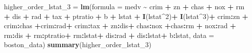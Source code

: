 \documentclass[
]{article}
\newenvironment{Shaded}{\begin{snugshade}}{\end{snugshade}}
\newcommand{\AttributeTok}[1]{\textcolor[rgb]{0.13,0.29,0.53}{#1}}
\newcommand{\DecValTok}[1]{\textcolor[rgb]{0.00,0.00,0.81}{#1}}
\newcommand{\FunctionTok}[1]{\textcolor[rgb]{0.13,0.29,0.53}{\textbf{#1}}}
\newcommand{\NormalTok}[1]{#1}
\newcommand{\OtherTok}[1]{\textcolor[rgb]{0.56,0.35,0.01}{#1}}
\newcommand{\SpecialCharTok}[1]{\textcolor[rgb]{0.81,0.36,0.00}{\textbf{#1}}}
\begin{document}
\begin{Shaded}
\begin{Highlighting}[]
\NormalTok{higher\_order\_lstat\_3 }\OtherTok{=} \FunctionTok{lm}\NormalTok{(}\AttributeTok{formula =}\NormalTok{ medv }\SpecialCharTok{\textasciitilde{}}\NormalTok{ crim }\SpecialCharTok{+}\NormalTok{ zn }\SpecialCharTok{+}\NormalTok{ chas }\SpecialCharTok{+}\NormalTok{ nox }\SpecialCharTok{+}\NormalTok{ rm }\SpecialCharTok{+}\NormalTok{ dis }\SpecialCharTok{+}\NormalTok{ rad }\SpecialCharTok{+}\NormalTok{ tax }\SpecialCharTok{+}\NormalTok{ ptratio }\SpecialCharTok{+}\NormalTok{ b }\SpecialCharTok{+}\NormalTok{ lstat }\SpecialCharTok{+} \FunctionTok{I}\NormalTok{(lstat}\SpecialCharTok{\^{}}\DecValTok{2}\NormalTok{)}\SpecialCharTok{+} \FunctionTok{I}\NormalTok{(lstat}\SpecialCharTok{\^{}}\DecValTok{3}\NormalTok{)}\SpecialCharTok{+}\NormalTok{ crim}\SpecialCharTok{:}\NormalTok{zn }\SpecialCharTok{+}\NormalTok{ crim}\SpecialCharTok{:}\NormalTok{chas  }\SpecialCharTok{+}\NormalTok{crim}\SpecialCharTok{:}\NormalTok{rad}\SpecialCharTok{+}\NormalTok{ crim}\SpecialCharTok{:}\NormalTok{tax }\SpecialCharTok{+}\NormalTok{ zn}\SpecialCharTok{:}\NormalTok{dis}\SpecialCharTok{+}\NormalTok{ chas}\SpecialCharTok{:}\NormalTok{nox }\SpecialCharTok{+}\NormalTok{chas}\SpecialCharTok{:}\NormalTok{rm }\SpecialCharTok{+}\NormalTok{ nox}\SpecialCharTok{:}\NormalTok{rad }\SpecialCharTok{+}\NormalTok{ rm}\SpecialCharTok{:}\NormalTok{dis }\SpecialCharTok{+}\NormalTok{ rm}\SpecialCharTok{:}\NormalTok{ptratio}\SpecialCharTok{+}\NormalTok{ rm}\SpecialCharTok{:}\NormalTok{lstat}\SpecialCharTok{+}\NormalTok{ dis}\SpecialCharTok{:}\NormalTok{rad }\SpecialCharTok{+}\NormalTok{ dis}\SpecialCharTok{:}\NormalTok{lstat}\SpecialCharTok{+}\NormalTok{ b}\SpecialCharTok{:}\NormalTok{lstat, }\AttributeTok{data =}\NormalTok{ boston\_data)}
\FunctionTok{summary}\NormalTok{(higher\_order\_lstat\_3)}
\end{Highlighting}
\end{Shaded}
\end{document}
